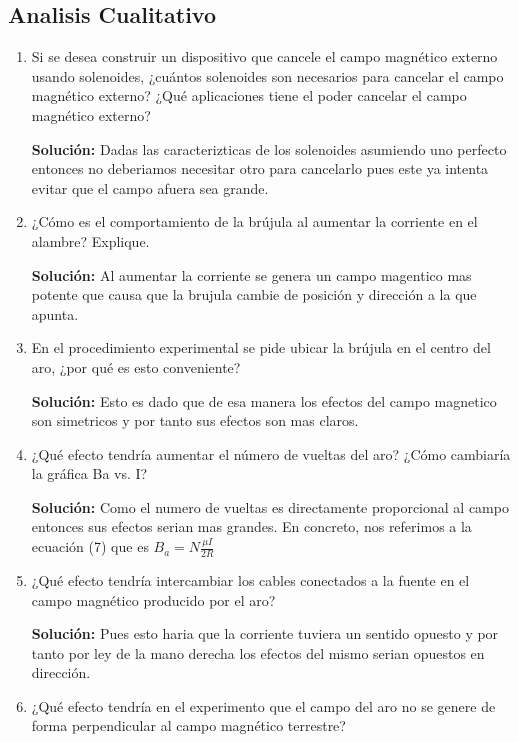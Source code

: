 \documentclass[12pt]{exam}
\begin{document}
\begin{multicols}{2}
\section{Analisis Cualitativo}
\begin{enumerate}
\item Si se desea construir un dispositivo que cancele
 el campo magnético externo usando solenoides,
¿cuántos solenoides son necesarios para cancelar el
campo magnético externo? ¿Qué aplicaciones tiene el
poder cancelar el campo magnético externo?

\textbf{Solución: }Dadas las caracterizticas de los solenoides asumiendo uno perfecto
entonces no deberiamos necesitar otro para cancelarlo pues este ya
intenta evitar que el campo afuera sea grande.

\item ¿Cómo es el comportamiento de la brújula al aumentar la corriente en el alambre? Explique.

\textbf{Solución: } Al aumentar la corriente se genera un campo magentico mas potente que causa que la brujula
cambie de posición y dirección a la que apunta.

\item En el procedimiento experimental se pide ubicar la
brújula en el centro del aro, ¿por qué es esto conveniente?

\textbf{Solución: } Esto es dado que de esa manera los efectos del campo magnetico son simetricos y por tanto
sus efectos son mas claros.

\item  ¿Qué efecto tendría aumentar el número de vueltas
del aro? ¿Cómo cambiaría la gráfica Ba vs. I?

\textbf{Solución: } Como el numero de vueltas es directamente proporcional al campo entonces sus efectos serian mas grandes.
En concreto, nos referimos a la ecuación (7) que es $B_a = N\frac{\mu I}{2 R}$

\item ¿Qué efecto tendría intercambiar los cables conectados a la fuente en el campo magnético producido por
el aro?

\textbf{Solución: } Pues esto haria que la corriente tuviera un sentido opuesto y por tanto por ley de la mano derecha
los efectos del mismo serian opuestos en dirección.

\item ¿Qué efecto tendría en el experimento que el campo
del aro no se genere de forma perpendicular al campo
magnético terrestre?


\end{enumerate}
\end{multicols}
\end{document}
